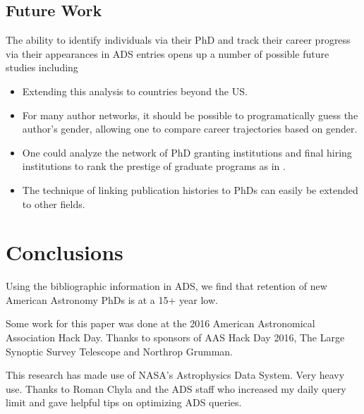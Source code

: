 \documentclass[preprint2]{aastex}
\begin{document}
\subsection{Future Work}

The ability to identify individuals via their PhD and track their career progress via their appearances in ADS entries opens up a number of possible future studies including
\begin{itemize}
\item{Extending this analysis to countries beyond the US.}
\item{For many author networks, it should be possible to programatically guess the author's gender, allowing one to compare career trajectories based on gender.}
\item{One could analyze the network of PhD granting institutions and final hiring institutions to rank the prestige of graduate programs as in \citet{Clausete15}.}
\item{The technique of linking publication histories to PhDs can easily be extended to other fields.}
\end{itemize}

\section{Conclusions}
Using the bibliographic information in ADS, we find that retention of new American Astronomy PhDs is at a 15+ year low.  


\acknowledgments
Some work for this paper was done at the 2016 American Astronomical Association Hack Day. Thanks to sponsors of AAS Hack Day 2016, The Large Synoptic Survey Telescope and Northrop Grumman.

This research has made use of NASA's Astrophysics Data System. Very heavy use. Thanks to Roman Chyla and the ADS staff who increased my daily query limit and gave helpful tips on optimizing ADS queries.





\end{document}
